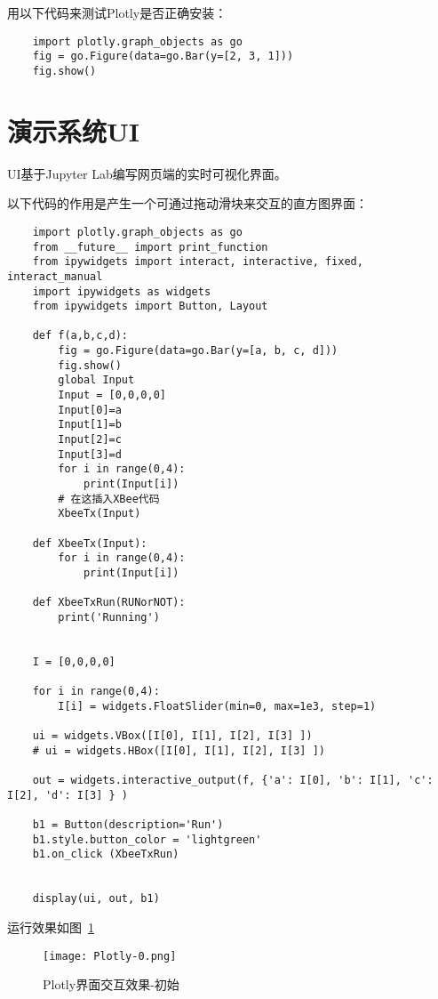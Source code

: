 用以下代码来测试Plotly是否正确安装：

\begin{verbatim}
    import plotly.graph_objects as go
    fig = go.Figure(data=go.Bar(y=[2, 3, 1]))
    fig.show()
\end{verbatim}

\section{演示系统UI}

UI基于Jupyter Lab编写网页端的实时可视化界面。

以下代码的作用是产生一个可通过拖动滑块来交互的直方图界面：

\begin{verbatim}
    import plotly.graph_objects as go
    from __future__ import print_function
    from ipywidgets import interact, interactive, fixed, interact_manual
    import ipywidgets as widgets
    from ipywidgets import Button, Layout

    def f(a,b,c,d):
        fig = go.Figure(data=go.Bar(y=[a, b, c, d]))
        fig.show()
        global Input
        Input = [0,0,0,0]
        Input[0]=a
        Input[1]=b
        Input[2]=c
        Input[3]=d
        for i in range(0,4):
            print(Input[i])
        # 在这插入XBee代码
        XbeeTx(Input)
        
    def XbeeTx(Input):
        for i in range(0,4):
            print(Input[i])    

    def XbeeTxRun(RUNorNOT):
        print('Running')           
            
            
    I = [0,0,0,0]

    for i in range(0,4):
        I[i] = widgets.FloatSlider(min=0, max=1e3, step=1)

    ui = widgets.VBox([I[0], I[1], I[2], I[3] ])
    # ui = widgets.HBox([I[0], I[1], I[2], I[3] ])

    out = widgets.interactive_output(f, {'a': I[0], 'b': I[1], 'c': I[2], 'd': I[3] } )

    b1 = Button(description='Run')
    b1.style.button_color = 'lightgreen'
    b1.on_click (XbeeTxRun)


    display(ui, out, b1)
\end{verbatim}

运行效果如图~\ref{fig:Plotly-0}

\begin{figure}[htbp]
    \centering
    \texttt{[image: Plotly-0.png]}
    \caption{Plotly界面交互效果-初始}
    \label{fig:Plotly-0}
\end{figure}

